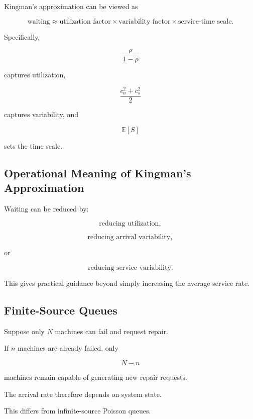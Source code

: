 Kingman's approximation can be viewed as

\[
\boxed{
\text{waiting}
\approx
\text{utilization factor}
\times
\text{variability factor}
\times
\text{service-time scale}.
}
\]

Specifically,

\[
\boxed{
\frac{\rho}{1-\rho}
}
\]

captures utilization,

\[
\boxed{
\frac{c_a^2+c_s^2}{2}
}
\]

captures variability, and

\[
\boxed{
\mathbb{E}[S]
}
\]

sets the time scale.

\subsection{Operational Meaning of Kingman's Approximation}
\label{subsec:kingman-operational-meaning}

Waiting can be reduced by:

\[
\boxed{
\text{reducing utilization},
}
\]

\[
\boxed{
\text{reducing arrival variability},
}
\]

or

\[
\boxed{
\text{reducing service variability}.
}
\]

This gives practical guidance beyond simply increasing the average service
rate.

\subsection{Finite-Source Queues}
\label{subsec:finite-source-queues}

Suppose only \(N\) machines can fail and request repair.

If \(n\) machines are already failed, only

\[
N-n
\]

machines remain capable of generating new repair requests.

The arrival rate therefore depends on system state.

This differs from infinite-source Poisson queues.

